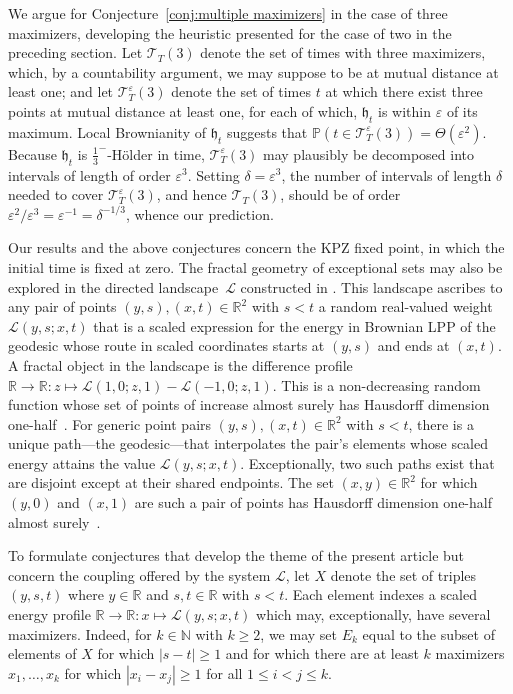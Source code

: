 \documentclass[oneside,final,11pt]{amsart}
\theoremstyle{definition}
\newcommand{\fh}{\mathfrak{h}}
\newcommand{\R}{\mathbb{R}}
\newcommand{\nn}{\mathbb{N}}
\newcommand{\N}{\nn}
\newcommand{\CT}{\mathcal{T}}
\newcommand{\1}[1]{\mathbf{1}_{#1}}
\newcommand{\eps}{\varepsilon}
\newcommand{\mc}{\mathcal}
\renewcommand{\P}{\mathbb P}
\numberwithin{equation}{section}
\begin{document}
We argue for Conjecture~\ref{conj:multiple maximizers} in the case of three maximizers,  developing the heuristic presented for the case of two in the preceding section.
 Let $\CT_T(3)$ denote the set of times with three maximizers, which, by a countability argument, we may suppose to be at mutual distance at least one; and
 let $\CT_T^\eps(3)$ denote the set of times $t$ at which there exist three points at mutual distance at least one, for each of which, $\fh_t$ is within $\eps$ of its maximum. Local Brownianity of $\fh_t$  suggests that $\P(t\in \CT_T^\eps(3)) = \Theta(\varepsilon^2)$. Because $\fh_t$ is $\tfrac{1}{3}^{{\scriptscriptstyle-}}$-H\"older in time, $\CT_T^\eps(3)$ may plausibly be decomposed into intervals of length of order $\varepsilon^3$. Setting $\delta = \varepsilon^3$, the number of intervals of length $\delta$ needed to cover $\CT_T^\varepsilon(3)$, and hence $\CT_T(3)$, should be of order $\varepsilon^2/\varepsilon^3 = \varepsilon^{-1} = \delta^{-1/3}$, whence our prediction.

\medskip
Our results and the above conjectures concern the  KPZ fixed point, in which the initial time is fixed at zero. The fractal geometry of exceptional sets may also be explored in the directed landscape~$\mc{L}$ constructed in \cite{Landscape}. This landscape ascribes to any pair of points $(y,s),(x,t) \in \R^2$ with $s < t$
a random real-valued weight $\mc{L}(y,s;x,t)$ that is a scaled expression for the energy in Brownian LPP of the geodesic whose route in scaled coordinates starts at $(y,s)$ and ends at $(x,t)$. A fractal object in the landscape is the difference profile $\R \to \R: z \mapsto \mc{L}(1,0;z,1) - \mc{L}(-1,0;z,1)$. This is a non-decreasing random function whose set of points of increase almost surely has Hausdorff dimension one-half~\cite{basu2019fractal}. For generic point pairs $(y,s),(x,t) \in \R^2$ with $s < t$, there is a unique path---the geodesic---that interpolates the pair's elements whose scaled energy attains the value  $\mc{L}(y,s;x,t)$. Exceptionally, two such paths exist that are disjoint except at their shared endpoints. The set $(x,y) \in \R^2$ for which $(y,0)$ and $(x,1)$ are such a pair of points has Hausdorff dimension one-half almost surely~\cite{BatesGangulyHammond}.

To formulate conjectures that develop the theme of the present article but concern the coupling offered by the system $\mc{L}$, let $X$ denote the set of triples $(y,s,t)$ where $y \in \R$ and $s,t \in \R$ with $s < t$.
Each element indexes a scaled energy profile $\R \to \R: x \mapsto \mc{L}(y,s;x,t)$ which may, exceptionally, have several maximizers.
Indeed, for  $k \in \N$ with $k \geq 2$, we may set $E_k$ equal to the subset of elements of $X$ for which $|s-t|\geq 1$ and for which there are at least $k$ maximizers $x_1,\ldots, x_k$ for which $|x_i-x_j|\geq 1$ for all $1\leq i<j\leq k$.
\end{document}
